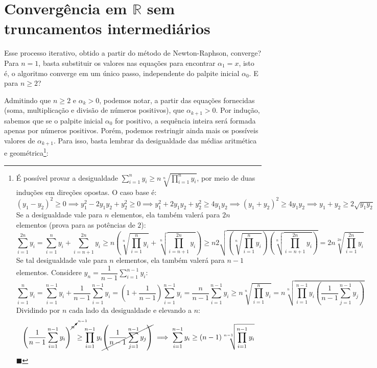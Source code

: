 \documentclass{article}
\begin{document}
\section*{Convergência em $\mathds{R}$ sem truncamentos intermediários}

Esse processo iterativo,
obtido a partir do método de Newton-Raphson,
converge?
Para $n = 1$, basta substituir os valores nas equações
para encontrar $\alpha_1 = x$,
isto é, o algoritmo converge em um único passo,
independente do palpite inicial $\alpha_0$.
E para $n \ge 2$?

Admitindo que $n \ge 2$ e $\alpha_k > 0$,
podemos notar, a partir das equações fornecidas
(soma, multiplicação e divisão de números positivos),
que $\alpha_{k+1} > 0$.
Por indução, sabemos que se o palpite inicial $\alpha_0$ for positivo,
a sequência inteira será formada apenas por números positivos.
Porém, podemos restringir ainda mais
os possíveis valores de $\alpha_{k+1}$.
Para isso, basta lembrar
da desigualdade das médias aritmética e geométrica\footnote{
  É possível provar a desigualdade
  $\sum_{i=1}^n y_i \ge n \sqrt[n]{\prod_{i=1}^n y_i}$,
  por meio de duas induções em direções opostas.
  O caso base é:
  \[
    (y_1 - y_2)^2 \ge 0
    \implies y_1^2 - 2 y_1 y_2 + y_2^2 \ge 0
    \implies y_1^2 + 2 y_1 y_2 + y_2^2 \ge 4 y_1 y_2
    \implies (y_1 + y_2)^2 \ge 4 y_1 y_2
    \implies y_1 + y_2 \ge 2 \sqrt{y_1 y_2}
  \]
  Se a desigualdade vale para $n$ elementos,
  ela também valerá para $2n$ elementos
  (prova para as potências de $2$):
  \[
    \sum_{i=1}^{2n} y_i
    = \sum_{i=1}^{n} y_i + \sum_{i=n+1}^{2n} y_i
    \ge n \left( \sqrt[n]{\prod_{i=1}^n y_i}
               + \sqrt[n]{\prod_{i=n+1}^{2n} y_i} \right)
    \ge n 2 \sqrt{ \left( \sqrt[n]{\prod_{i=1}^n y_i} \right)
                   \left( \sqrt[n]{\prod_{i=n+1}^{2n} y_i} \right) }
    = 2n \sqrt[2n]{\prod_{i=1}^{2n} y_i}
  \]
  Se tal desigualdade vale para $n$ elementos,
  ela também valerá para $n-1$ elementos.
  Considere $y_n = \dfrac{1}{n-1} \sum_{i=1}^{n-1} y_i$:
  \[
    \sum_{i=1}^{n} y_i
    = \sum_{i=1}^{n-1} y_i + \dfrac{1}{n-1} \sum_{i=1}^{n-1} y_i
    = \left( 1 + \dfrac{1}{n-1} \right) \sum_{i=1}^{n-1} y_i
    = \dfrac{n}{n-1} \sum_{i=1}^{n-1} y_i
    \ge n \sqrt[n]{\prod_{i=1}^n y_i}
    = n \sqrt[n]{\prod_{i=1}^{n-1} y_i
                 \left( \dfrac{1}{n-1} \sum_{j=1}^{n-1} y_j \right)}
  \]
  Dividindo por $n$ cada lado da desigualdade e elevando a $n$:
  \[
    \left( \dfrac{1}{n-1}
           \sum_{i=1}^{n-1} y_i \right)^{\cancelto{n-1}{n}}
    \ge \prod_{i=1}^{n-1} y_i
        \cancel{\left( \dfrac{1}{n-1} \sum_{j=1}^{n-1} y_j \right)}
    \implies
    \sum_{i=1}^{n-1} y_i \ge (n-1) \sqrt[n-1]{\prod_{i=1}^{n-1} y_i}
  \]
  \hfill$\blacksquare$
}:
\end{document}
